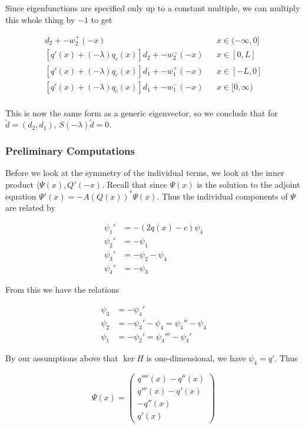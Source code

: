 \documentclass[12pt]{article}
\begin{document}
Since eigenfunctions are specified only up to a constant multiple, we can multiply this whole thing by $-1$ to get

\begin{align*}
[q'(x) + (-\lambda) q_c(x)]d_2 + -w_2^+(-x) && x \in (-\infty, 0] \\
[q'(x) + (-\lambda) q_c(x)]d_2 + -w_2^-(-x) && x \in [0, L] \\
[q'(x) + (-\lambda) q_c(x)]d_1 + -w_1^+(-x) && x \in [-L, 0] \\
[q'(x) + (-\lambda) q_c(x)]d_1 + -w_1^-(-x) && x \in [0, \infty) \\
\end{align*}

This is now the same form as a generic eigenvector, so we conclude that for $\tilde{d} = (d_2, d_1)$, $S(-\lambda)\tilde{d} = 0$.\\

\subsubsection*{Preliminary Computations}

Before we look at the symmetry of the individual terms, we look at the inner product $\langle \Psi(x), Q'(-x)$. Recall that since $\Psi(x)$ is the solution to the adjoint equation $\Psi'(x) = -A(Q(x))^* \Psi(x)$. Thus the individual components of $\Psi$ are related by

\begin{align*}
\psi_1' &= -(2q(x) - c) \psi_4 \\
\psi_2' &= -\psi_1 \\
\psi_3' &= -\psi_2 - \psi_4 \\
\psi_4' &= -\psi_3
\end{align*}

From this we have the relations

\begin{align*}
\psi_3 &= -\psi_4' \\
\psi_2 &= -\psi_3' - \psi_4 = \psi_4'' - \psi_4 \\
\psi_1 &= -\psi_2' = \psi_4''' - \psi_4'
\end{align*}

By our assumptions above that $\ker H$ is one-dimensional, we have $\psi_4 = q'$. Thus

\[
\Psi(x) = \begin{pmatrix}
q''''(x) - q''(x) \\
q'''(x) - q'(x) \\
-q''(x) \\
q'(x)
\end{pmatrix}
\]
\end{document}
